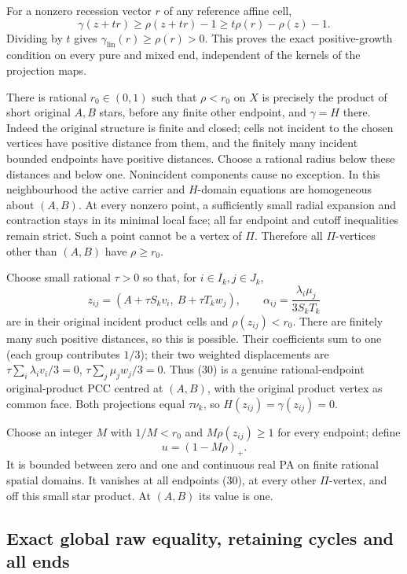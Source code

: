 \documentclass[
  11pt,
]{article}
\begin{document}
For a nonzero recession vector \(r\) of any reference affine cell, \[
 \gamma(z+tr)\geq\rho(z+tr)-1\geq t\rho(r)-\rho(z)-1.
\] Dividing by \(t\) gives \(\gamma_{\mathrm{lin}}(r)\geq\rho(r)>0\).
This proves the exact positive-growth condition on every pure and mixed
end, independent of the kernels of the projection maps.

There is rational \(r_0\in(0,1)\) such that \(\rho<r_0\) on \(X\) is
precisely the product of short original \(A,B\) stars, before any finite
other endpoint, and \(\gamma=H\) there. Indeed the original structure is
finite and closed; cells not incident to the chosen vertices have
positive distance from them, and the finitely many incident bounded
endpoints have positive distances. Choose a rational radius below these
distances and below one. Nonincident components cause no exception. In
this neighbourhood the active carrier and \(H\)-domain equations are
homogeneous about \((A,B)\). At every nonzero point, a sufficiently
small radial expansion and contraction stays in its minimal local face;
all far endpoint and cutoff inequalities remain strict. Such a point
cannot be a vertex of \(\Pi\). Therefore all \(\Pi\)-vertices other than
\((A,B)\) have \(\rho\geq r_0\).

Choose small rational \(\tau>0\) so that, for \(i\in I_k,j\in J_k\), \[
 z_{ij}=(A+\tau S_kv_i,\ B+\tau T_kw_j),\qquad
 \alpha_{ij}=\frac{\lambda_i\mu_j}{3S_kT_k}                 \tag{30}
\] are in their original incident product cells and
\(\rho(z_{ij})<r_0\). There are finitely many such positive distances,
so this is possible. Their coefficients sum to one (each group
contributes \(1/3\)); their two weighted displacements are
\(\tau\sum_i\lambda_iv_i/3=0\), \(\tau\sum_j\mu_jw_j/3=0\). Thus (30) is
a genuine rational-endpoint original-product PCC centred at \((A,B)\),
with the original product vertex as common face. Both projections equal
\(\tau\nu_k\), so \(H(z_{ij})=\gamma(z_{ij})=0\).

Choose an integer \(M\) with \(1/M<r_0\) and \(M\rho(z_{ij})\geq1\) for
every endpoint; define \[
                          u=(1-M\rho)_+.                  \tag{31}
\] It is bounded between zero and one and continuous real PA on finite
rational spatial domains. It vanishes at all endpoints (30), at every
other \(\Pi\)-vertex, and off this small star product. At \((A,B)\) its
value is one.

\subsection{Exact global raw equality, retaining cycles and all
ends}\label{exact-global-raw-equality-retaining-cycles-and-all-ends}
\end{document}
